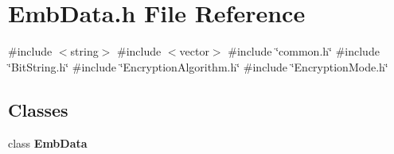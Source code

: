 \section{Emb\+Data.\+h File Reference}
\label{EmbData_8h}
{\ttfamily \#include $<$string$>$}\newline
{\ttfamily \#include $<$vector$>$}\newline
{\ttfamily \#include \char`\"{}common.\+h\char`\"{}}\newline
{\ttfamily \#include \char`\"{}Bit\+String.\+h\char`\"{}}\newline
{\ttfamily \#include \char`\"{}Encryption\+Algorithm.\+h\char`\"{}}\newline
{\ttfamily \#include \char`\"{}Encryption\+Mode.\+h\char`\"{}}\newline
\subsection*{Classes}
\begin{DoxyCompactItemize}
\item 
class \textbf{ Emb\+Data}
\end{DoxyCompactItemize}

